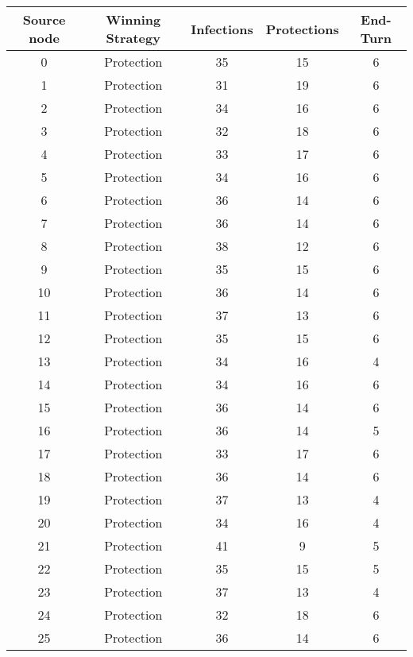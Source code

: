 \documentclass[results.tex]{subfiles}
\begin{document}
\begin{center}
  \begin{tabular}{| c || c | c | c | c |}
    \hline
    {\bfseries Source node} & {\bfseries Winning Strategy} & {\bfseries Infections} & {\bfseries Protections} & {\bfseries End-Turn} \\  %
    \hline\hline
    0 & Protection & 35 & 15 & 6 \\ 
    \hline
    1 & Protection & 31 & 19 & 6 \\ 
    \hline
    2 & Protection & 34 & 16 & 6 \\ 
    \hline
    3 & Protection & 32 & 18 & 6 \\ 
    \hline
    4 & Protection & 33 & 17 & 6 \\ 
    \hline
    5 & Protection & 34 & 16 & 6 \\ 
    \hline
    6 & Protection & 36 & 14 & 6 \\ 
    \hline
    7 & Protection & 36 & 14 & 6 \\ 
    \hline
    8 & Protection & 38 & 12 & 6 \\ 
    \hline
    9 & Protection & 35 & 15 & 6 \\ 
    \hline
    10 & Protection & 36 & 14 & 6 \\ 
    \hline
    11 & Protection & 37 & 13 & 6 \\ 
    \hline
    12 & Protection & 35 & 15 & 6 \\ 
    \hline
    13 & Protection & 34 & 16 & 4 \\ 
    \hline
    14 & Protection & 34 & 16 & 6 \\ 
    \hline
    15 & Protection & 36 & 14 & 6 \\ 
    \hline
    16 & Protection & 36 & 14 & 5 \\ 
    \hline
    17 & Protection & 33 & 17 & 6 \\ 
    \hline
    18 & Protection & 36 & 14 & 6 \\ 
    \hline
    19 & Protection & 37 & 13 & 4 \\ 
    \hline
    20 & Protection & 34 & 16 & 4 \\ 
    \hline
    21 & Protection & 41 & 9 & 5 \\ 
    \hline
    22 & Protection & 35 & 15 & 5 \\ 
    \hline
    23 & Protection & 37 & 13 & 4 \\ 
    \hline
    24 & Protection & 32 & 18 & 6 \\ 
    \hline
    25 & Protection & 36 & 14 & 6 \\ 

\end{tabular}
\end{center}
\end{document}
